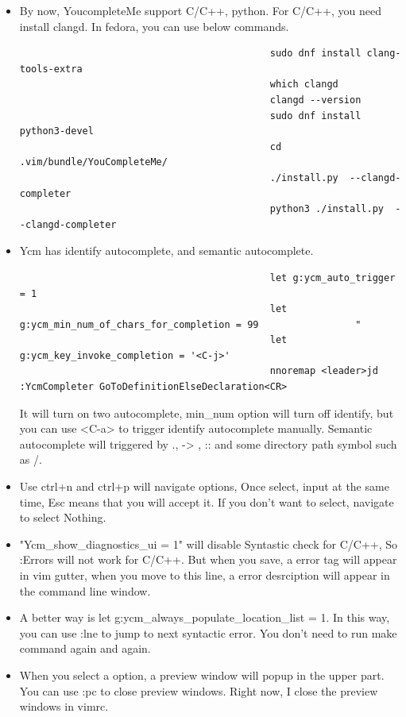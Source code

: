\documentclass[paper=8.5in:11in, twoside, 12pt, pagesize=pdftex]{book}
\begin{document}
\begin{itemize}
										\item By now, YoucompleteMe support C/C++, python. For C/C++, you need install clangd. In fedora, you can use below commands.
										\begin{verbatim}
											sudo dnf install clang-tools-extra
											which clangd
											clangd --version
											sudo dnf install python3-devel
											cd .vim/bundle/YouCompleteMe/
											./install.py  --clangd-completer
											python3 ./install.py  --clangd-completer
										\end{verbatim}	
										
										\item Ycm has identify autocomplete, and semantic autocomplete. 
										\begin{verbatim}
											let g:ycm_auto_trigger = 1
											let g:ycm_min_num_of_chars_for_completion = 99                 "
											let g:ycm_key_invoke_completion = '<C-j>'
											nnoremap <leader>jd :YcmCompleter GoToDefinitionElseDeclaration<CR>
										\end{verbatim}
										It will turn on two autocomplete, min\_num option will turn off identify, but you can use <C-a> to trigger identify autocomplete manually. Semantic autocomplete will triggered by ., -> , :: and some directory path symbol such as /. 
										
										\item Use ctrl+n and ctrl+p will navigate options, Once select, input at the same time, Esc means that you will accept it. If you don't want to select, navigate to select Nothing. 
										
										\item "Ycm\_show\_diagnostics\_ui = 1" will disable Syntastic check for C/C++, So :Errors will not work for C/C++. But when you save, a error tag will appear in vim gutter, when you move to this line, a error desrciption will appear in the command line window. 
										
										\item A better way is let g:ycm\_always\_populate\_location\_list = 1. In this way, you can use :lne to jump to next syntactic error. You don't need to run make command again and again.
										
										\item When you select a option, a preview window will popup in the upper part. You can use :pc to close preview windows. Right now, I close the preview windows in vimrc.
										

\end{itemize}
\end{document}
